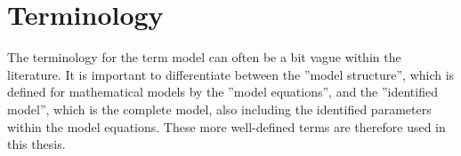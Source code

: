 \section{Terminology} \label{sec:terminology}
The terminology for the term model can often be a bit vague within the literature.
It is important to differentiate between the ''model structure'', which is defined for mathematical models by the ''model equations'', and the ''identified model'', which is the complete model, also including the identified parameters within the model equations. These more well-defined terms are therefore used in this thesis.